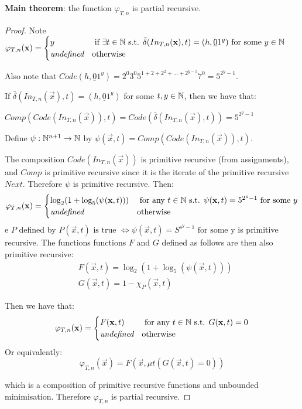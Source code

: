 \textbf{Main theorem}: the function $ \varphi_{T, n} $ is partial recursive.

\begin{proof}
	
Note $ \varphi_{T, n}(\mathbf{x}) = \begin{cases}
y &\text{ if } \exists t \in \mathbb{N} \text{ s.t. } \bar{\delta}(In_{T, n}(\mathbf{x}), t) = (h, \underline{0} 1^y) \text{ for some } y \in \mathbb{N}\\
\textit{undefined} &\text{otherwise}
\end{cases} $

Also note that $ Code(h, \underline{0} 1^y) = 2^0 3^0 5^{1 + 2 + 2^2 + \dots + 2^{y - 1}} 7^0 = 5^{2^y - 1}$.

If $ \bar{\delta}(In_{T, n}(\vec{x}), t) = (h, \underline{0} 1^y) $ for some $ t, y \in \mathbb{N} $, then we have that:

$ Comp(Code(In_{T, n}(\vec{x})), t) = Code(\bar{\delta}(In_{T, n}(\vec{x}), t)) = 5^{2^y - 1} $

Define $ \psi: \mathbb{N}^{n+1} \to \mathbb{N} $ by $ \psi(\vec{x}, t) = Comp(Code(In_{T, n}(\vec{x})), t) $.

The composition $ Code(In_{T, n}(\vec{x})) $ is primitive recursive (from assignments), and $ Comp $ is primitive recursive since it is the iterate of the primitive recursive $ Next $. Therefore $ \psi $ is primitive recursive. Then:
\begin{equation*}
\varphi_{T, n}(\mathbf{x}) = \begin{cases}
\log_2 (1 + \log_5(\psi(\mathbf{x}, t))) &\text{ for any } t \in \mathbb{N} \text{ s.t. } \psi(\mathbf{x}, t) = 5^{2^y - 1} \text{ for some } y\\
\textit{undefined} &\text{otherwise}
\end{cases}
\end{equation*}e $ P $ defined by $ P(\vec{x}, t) \text{ is true } \iff \psi(\vec{x}, t) = S^{s^y - 1} \text{ for some y} $ is primitive recursive.
The functions functions $ F $ and $ G $ defined as follows are then also primitive recursive:
\begin{align*}
&F(\vec{x}, t) = \log_2 (1 + \log_5(\psi(\vec{x}, t)))\\
&G(\vec{x}, t) = 1 - \chi_{P}(\vec{x}, t)
\end{align*}

Then we have that:
\begin{equation*}
\varphi_{T, n}(\mathbf{x}) = \begin{cases}
F(\mathbf{x}, t) &\text{ for any } t \in \mathbb{N} \text{ s.t. } G(\mathbf{x}, t) = 0\\
\textit{undefined} &\text{otherwise}
\end{cases} 
\end{equation*}
Or equivalently:
\begin{equation*}
\varphi_{T, n}(\vec{x}) = F(\vec{x}, \mu t (G(\vec{x}, t) = 0))
\end{equation*}

which is a composition of primitive recursive functions and unbounded minimisation. Therefore $ \varphi_{T, n} $ is partial recursive.

\end{proof}

